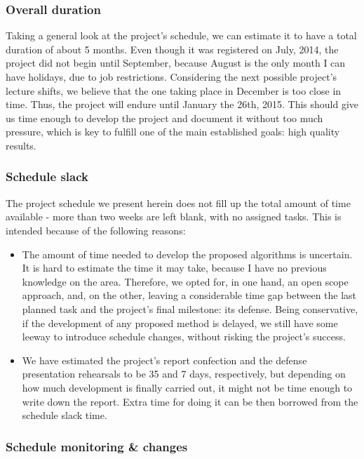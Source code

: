\subsubsection{Overall duration}

Taking a general look at the project’s schedule, we can estimate it to have a total duration of about 5 months. Even though it was registered on July, 2014, the project did not begin until September, because August is the only month I can have holidays, due to job restrictions. Considering the next possible project’s lecture shifts, we believe that the one taking place in December is too close in time. Thus, the project will endure until January the 26th, 2015. This should give us time enough to develop the project and document it without too much pressure, which is key to fulfill one of the main established goals: high quality results.

\subsubsection{Schedule slack}

The project schedule we present herein does not fill up the total amount of time available - more than two weeks are left blank, with no assigned tasks. This is intended because of the following reasons:

\begin{itemize}
	\item The amount of time needed to develop the proposed algorithms is uncertain. It is hard to estimate the time it may take, because I have no previous knowledge on the area. Therefore, we opted for, in one hand, an open scope approach, and, on the other, leaving a considerable time gap between the last planned task and the project’s final milestone: its defense. Being conservative, if the development of any proposed method is delayed, we still have some leeway to introduce schedule changes, without risking the project’s success.
	
	\item We have estimated the project’s report confection and the defense presentation rehearsals to be 35 and 7 days, respectively, but depending on how much development is finally carried out, it might not be time enough to write down the report. Extra time for doing it can be then borrowed from the schedule slack time.
	
\end{itemize}

\subsubsection{Schedule monitoring \& changes}

